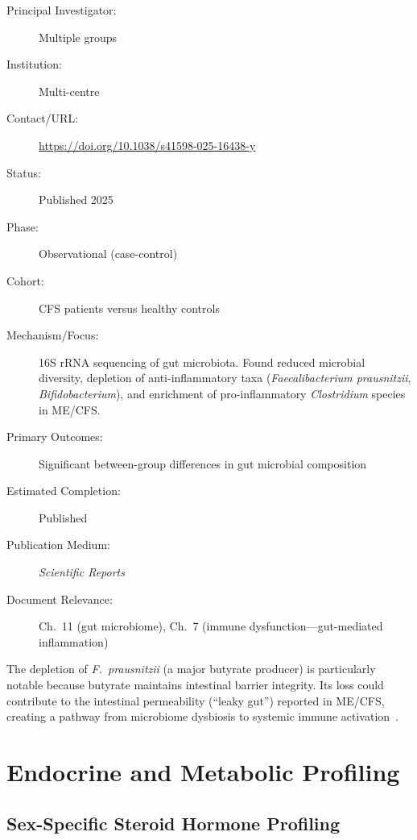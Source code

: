 \begin{description}
    \item[Principal Investigator:] Multiple groups
    \item[Institution:] Multi-centre
    \item[Contact/URL:] \url{https://doi.org/10.1038/s41598-025-16438-y}
    \item[Status:] Published 2025
    \item[Phase:] Observational (case-control)
    \item[Cohort:] CFS patients versus healthy controls
    \item[Mechanism/Focus:] 16S rRNA sequencing of gut microbiota.  Found
        reduced microbial diversity, depletion of anti-inflammatory taxa
        (\textit{Faecalibacterium prausnitzii}, \textit{Bifidobacterium}),
        and enrichment of pro-inflammatory \textit{Clostridium} species in
        ME/CFS.
    \item[Primary Outcomes:] Significant between-group differences in gut
        microbial composition
    \item[Estimated Completion:] Published
    \item[Publication Medium:] \textit{Scientific Reports}
    \item[Document Relevance:] Ch.~11 (gut microbiome), Ch.~7 (immune
        dysfunction---gut-mediated inflammation)
\end{description}

The depletion of \textit{F.\ prausnitzii} (a major butyrate producer) is
particularly notable because butyrate maintains intestinal barrier integrity.
Its loss could contribute to the intestinal permeability (``leaky gut'')
reported in ME/CFS, creating a pathway from microbiome dysbiosis to systemic
immune activation~\cite{GutMicrobialComposition2025}.

\section{Endocrine and Metabolic Profiling}
\label{sec:registry-endocrine}

\subsection{Sex-Specific Steroid Hormone Profiling}
\label{sec:registry-steroid-hormones}

